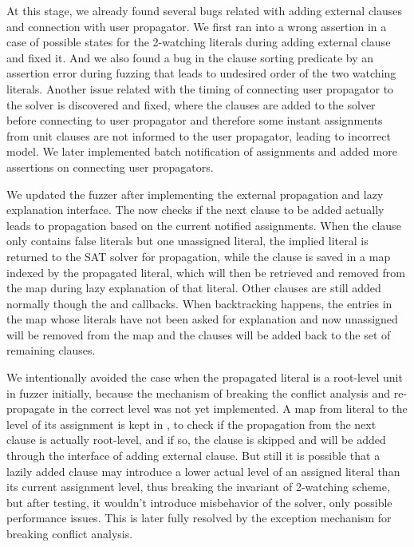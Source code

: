 At this stage, we already found several bugs related with adding external clauses and connection with user propagator. We first ran into a wrong assertion in a case of possible states for the 2-watching literals during adding external clause and fixed it. And we also found a bug in the clause sorting predicate by an assertion error during fuzzing that leads to undesired order of the two watching literals. Another issue related with the timing of connecting user propagator to the solver is discovered and fixed, where the clauses are added to the solver before connecting to user propagator and therefore some instant assignments from unit clauses are not informed to the user propagator, leading to incorrect model. We later implemented batch notification of assignments and added more assertions on connecting user propagators.

We updated the fuzzer after implementing the external propagation and lazy explanation interface. The  now checks if the next clause to be added actually leads to propagation based on the current notified assignments. When the clause only contains false literals but one unassigned literal, the implied literal is returned to the SAT solver for propagation, while the clause is saved in a map indexed by the propagated literal, which will then be retrieved and removed from the map during lazy explanation of that literal. Other clauses are still added normally though the  and  callbacks. When backtracking happens, the entries in the map whose literals have not been asked for explanation and now unassigned will be removed from the map and the clauses will be added back to the set of remaining clauses.

We intentionally avoided the case when the propagated literal is a root-level unit in fuzzer initially, because the mechanism of breaking the conflict analysis and re-propagate in the correct level was not yet implemented. A map from literal to the level of its assignment is kept in , to check if the propagation from the next clause is actually root-level, and if so, the clause is skipped and will be added through the interface of adding external clause. But still it is possible that a lazily added clause may introduce a lower actual level of an assigned literal than its current assignment level, thus breaking the invariant of 2-watching scheme, but after testing, it wouldn't introduce misbehavior of the solver, only possible performance issues. This is later fully resolved by the exception mechanism for breaking conflict analysis.

